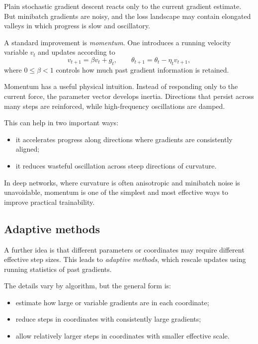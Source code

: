 Plain stochastic gradient descent reacts only to the current gradient estimate.
But minibatch gradients are noisy, and the loss landscape may contain elongated valleys in which progress is slow and oscillatory.

\medskip

A standard improvement is \emph{momentum}.
One introduces a running velocity variable $v_t$ and updates according to
\[
v_{t+1}=\beta v_t + g_t,
\qquad
\theta_{t+1}=\theta_t-\eta_t v_{t+1},
\]
where $0\le \beta<1$ controls how much past gradient information is retained.

\medskip

Momentum has a useful physical intuition.
Instead of responding only to the current force, the parameter vector develops inertia.
Directions that persist across many steps are reinforced, while high-frequency oscillations are damped.

\medskip

This can help in two important ways:
\begin{itemize}
    \item it accelerates progress along directions where gradients are consistently aligned;
    \item it reduces wasteful oscillation across steep directions of curvature.
\end{itemize}

\medskip

In deep networks, where curvature is often anisotropic and minibatch noise is unavoidable, momentum is one of the simplest and most effective ways to improve practical trainability.

\subsection*{Adaptive methods}

A further idea is that different parameters or coordinates may require different effective step sizes.
This leads to \emph{adaptive methods}, which rescale updates using running statistics of past gradients.

\medskip

The details vary by algorithm, but the general form is:
\begin{itemize}
    \item estimate how large or variable gradients are in each coordinate;
    \item reduce steps in coordinates with consistently large gradients;
    \item allow relatively larger steps in coordinates with smaller effective scale.
\end{itemize}

